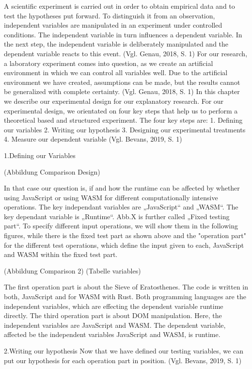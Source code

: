 A scientific experiment is carried out in order to obtain empirical data and to test the hypotheses put forward. To distinguish it from an observation, independent variables are manipulated in an experiment under controlled conditions. The independent variable in turn influences a dependent variable. In the next step, the independent variable is deliberately manipulated and the dependent variable reacts to this event. (Vgl. Genau, 2018, S. 1)
For our research, a laboratory experiment comes into question, as we create an artificial environment in which we can control all variables well. Due to the artificial environment we have created, assumptions can be made, but the results cannot be generalized with complete certainty. (Vgl. Genau, 2018, S. 1)
In this chapter we describe our experimental design for our explanatory research. 
For our experimental design, we orientated on four key steps that help us to perform a theoretical based and structured experiment. The four key steps are: 
1.	Defining our variables
2.	Writing our hypothesis
3.	Designing our experimental treatments
4.	Measure our dependent variable
(Vgl. Bevans, 2019, S. 1)

1.Defining our Variables

(Abbildung Comparison Design)

In that case our question is, if and how the runtime can be affected by whether using JavaScript or using WASM for different computationally intensive operations. The key independant variables are „JavaScript“ and „WASM“. The key dependant variable is „Runtime“. Abb.X is further called „Fixed testing part“.
To specify different input operations, we will show them in the following figures, while there is the fixed test part as shown above and the "operation part" for the different test operations, which define the input given to each, JavaScript and WASM within the fixed test part.

(Abbildung Comparison 2)
(Tabelle variables)

The first operation part is about the Sieve of Eratosthenes. The code is written in both, JavaScript and for WASM with Rust. Both programming languages are the independent variables, which are effecting the dependent variable runtime directly.
The third operation part is about DOM manipulation. Here, the independent variables are JavaScript and WASM. The dependent variable, affected be the independent variables JavaScript and WASM, is runtime.

2.Writing our hypothesis
Now that we have defined our testing variables, we can put our hypothesis for each operation part in position. (Vgl. Bevans, 2019, S. 1)

